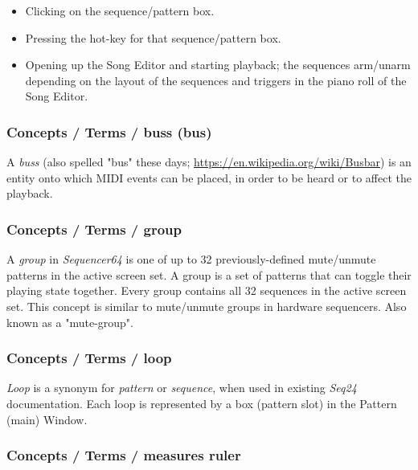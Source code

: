    \begin{itemize}
      \item Clicking on the sequence/pattern box.
      \item Pressing the hot-key for that sequence/pattern box.
      \item Opening up the Song Editor and starting playback; the
            sequences arm/unarm depending on the layout of the
            sequences and triggers in the piano roll of the Song Editor.
   \end{itemize}

\subsubsection{Concepts / Terms / buss (bus)}
\label{subsubsec:concepts_terms_buss}

   A \textsl{buss} (also spelled "bus" these days;
   \url{https://en.wikipedia.org/wiki/Busbar}) is an entity onto which
   MIDI events can be placed, in order to be heard or to affect the
   playback.

\subsubsection{Concepts / Terms / group}
\label{subsubsec:concepts_terms_group}

   A \textsl{group} in \textsl{Sequencer64} is one of up to 32
   previously-defined mute/unmute patterns in the active screen set.
   A group is a set of patterns that can toggle their playing state
   together.  Every group contains all 32 sequences in the active screen
   set.  This concept is similar to mute/unmute groups in hardware
   sequencers.
   Also known as a "mute-group".

\subsubsection{Concepts / Terms / loop}
\label{subsubsec:concepts_terms_loop}

   \textsl{Loop}
   is a synonym for \textsl{pattern} or \textsl{sequence}, when used
   in existing \textsl{Seq24} documentation.
   Each loop is represented by a box (pattern slot) in the Pattern (main)
   Window.

\subsubsection{Concepts / Terms / measures ruler}
\label{subsubsec:concepts_terms_measures_ruler}

